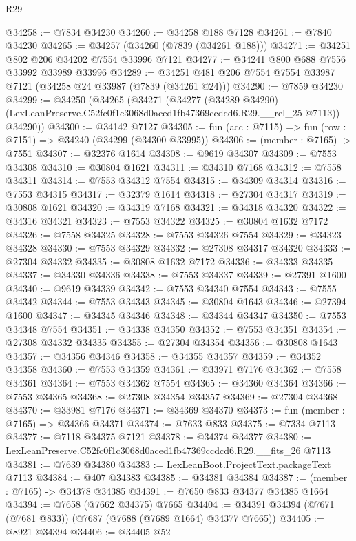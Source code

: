\begin{lexlean}{R29}
\begin{coremodule}
@34258 := @7834 @34230
@34260 := @34258 @188 @7128
@34261 := @7840 @34230
@34265 := @34257 (@34260 (@7839 (@34261 @188)))
@34271 := @34251 @802 @206 @34202 @7554 @33996 @7121
@34277 := @34241 @800 @688 @7556 @33992 @33989 @33996
@34289 := @34251 @481 @206 @7554 @7554 @33987 @7121 (@34258 @24 @33987 (@7839 (@34261 @24)))
@34290 := @7859 @34230
@34299 := @34250
    (@34265
      (@34271
        (@34277
          (@34289 @34290)
          (LexLeanPreserve.C52fc0f1c3068d0aced1fb47369ccdcd6.R29.__rel_25 @7113))
        @34290))
@34300 := @34142 @7127
@34305 := fun (acc : @7115) => fun (row : @7151) => @34240 (@34299 (@34300 @33995))
@34306 := (member : @7165) -> @7551
@34307 := @32376 @1614
@34308 := @9619 @34307
@34309 := @7553 @34308
@34310 := @30804 @1621
@34311 := @34310 @7168
@34312 := @7558 @34311
@34314 := @7553 @34312 @7554
@34315 := @34309 @34314
@34316 := @7553 @34315
@34317 := @32379 @1614
@34318 := @27304 @34317
@34319 := @30808 @1621
@34320 := @34319 @7168
@34321 := @34318 @34320
@34322 := @34316 @34321
@34323 := @7553 @34322
@34325 := @30804 @1632 @7172
@34326 := @7558 @34325
@34328 := @7553 @34326 @7554
@34329 := @34323 @34328
@34330 := @7553 @34329
@34332 := @27308 @34317 @34320
@34333 := @27304 @34332
@34335 := @30808 @1632 @7172
@34336 := @34333 @34335
@34337 := @34330 @34336
@34338 := @7553 @34337
@34339 := @27391 @1600
@34340 := @9619 @34339
@34342 := @7553 @34340 @7554
@34343 := @7555 @34342
@34344 := @7553 @34343
@34345 := @30804 @1643
@34346 := @27394 @1600
@34347 := @34345 @34346
@34348 := @34344 @34347
@34350 := @7553 @34348 @7554
@34351 := @34338 @34350
@34352 := @7553 @34351
@34354 := @27308 @34332 @34335
@34355 := @27304 @34354
@34356 := @30808 @1643
@34357 := @34356 @34346
@34358 := @34355 @34357
@34359 := @34352 @34358
@34360 := @7553 @34359
@34361 := @33971 @7176
@34362 := @7558 @34361
@34364 := @7553 @34362 @7554
@34365 := @34360 @34364
@34366 := @7553 @34365
@34368 := @27308 @34354 @34357
@34369 := @27304 @34368
@34370 := @33981 @7176
@34371 := @34369 @34370
@34373 := fun (member : @7165) => @34366 @34371
@34374 := @7633 @833
@34375 := @7334 @7113
@34377 := @7118 @34375 @7121
@34378 := @34374 @34377
@34380 := LexLeanPreserve.C52fc0f1c3068d0aced1fb47369ccdcd6.R29.__fits_26 @7113
@34381 := @7639 @34380
@34383 := LexLeanBoot.ProjectText.packageText @7113
@34384 := @407 @34383
@34385 := @34381 @34384
@34387 := (member : @7165) -> @34378 @34385
@34391 := @7650 @833 @34377 @34385 @1664
@34394 := @7658 (@7662 @34375) @7665
@34404 := @34391 @34394 (@7671 (@7681 @833)) (@7687 (@7688 (@7689 @1664) @34377 @7665))
@34405 := @8921 @34394
@34406 := @34405 @52

\end{coremodule}
\end{lexlean}
